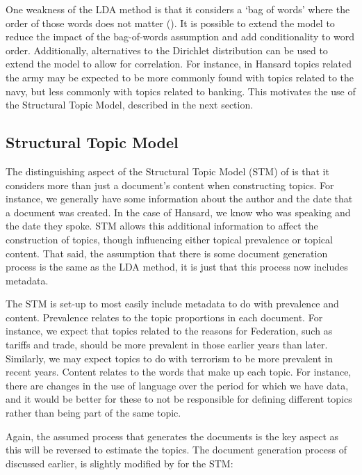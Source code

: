 \documentclass[12pt,]{article}
\theoremstyle{definition}
\theoremstyle{definition}
\theoremstyle{definition}
\theoremstyle{remark}
\begin{document}
One weakness of the LDA method is that it considers a `bag of words'
where the order of those words does not matter (\citet{blei2012}). It is
possible to extend the model to reduce the impact of the bag-of-words
assumption and add conditionality to word order. Additionally,
alternatives to the Dirichlet distribution can be used to extend the
model to allow for correlation. For instance, in Hansard topics related
the army may be expected to be more commonly found with topics related
to the navy, but less commonly with topics related to banking. This
motivates the use of the Structural Topic Model, described in the next
section.

\subsection{Structural Topic Model}\label{structural-topic-model}

The distinguishing aspect of the Structural Topic Model (STM) of
\citet{RobertsStewartAiroldi2016} is that it considers more than just a
document's content when constructing topics. For instance, we generally
have some information about the author and the date that a document was
created. In the case of Hansard, we know who was speaking and the date
they spoke. STM allows this additional information to affect the
construction of topics, though influencing either topical prevalence or
topical content. That said, the assumption that there is some document
generation process is the same as the LDA method, it is just that this
process now includes metadata.

The STM is set-up to most easily include metadata to do with prevalence
and content. Prevalence relates to the topic proportions in each
document. For instance, we expect that topics related to the reasons for
Federation, such as tariffs and trade, should be more prevalent in those
earlier years than later. Similarly, we may expect topics to do with
terrorism to be more prevalent in recent years. Content relates to the
words that make up each topic. For instance, there are changes in the
use of language over the period for which we have data, and it would be
better for these to not be responsible for defining different topics
rather than being part of the same topic.

Again, the assumed process that generates the documents is the key
aspect as this will be reversed to estimate the topics. The document
generation process of \citet{Blei2003latent} discussed earlier, is
slightly modified by \citet{RobertsStewartAiroldi2016} for the STM:
\end{document}
